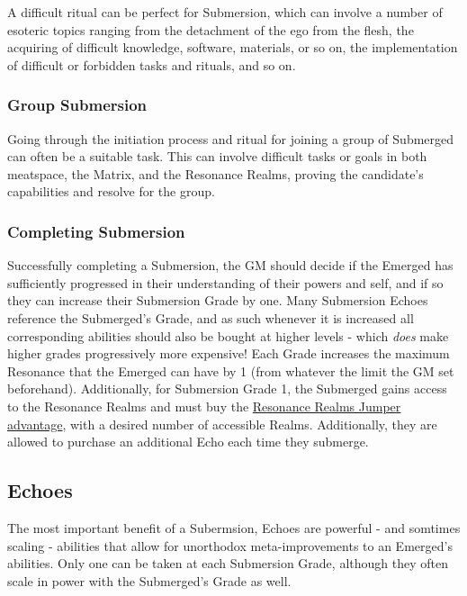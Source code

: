 \begin{multicols*}{3}
	A difficult ritual can be perfect for Submersion, which can involve a number of esoteric topics ranging from the detachment of the ego from the flesh, the acquiring of difficult knowledge, software, materials, or so on, the implementation of difficult or forbidden tasks and rituals, and so on.
	
	\subsubsection*{Group Submersion}
	
	Going through the initiation process and ritual for joining a group of Submerged can often be a suitable task. This can involve difficult tasks or goals in both meatspace, the Matrix, and the Resonance Realms, proving the candidate's capabilities and resolve for the group.
	
	\subsubsection*{Completing Submersion}
	
	Successfully completing a Submersion, the GM should decide if the Emerged has sufficiently progressed in their understanding of their powers and self, and if so they can increase their Submersion Grade by one. Many Submersion Echoes reference the Submerged's Grade, and as such whenever it is increased all corresponding abilities should also be bought at higher levels - which \textit{does} make higher grades progressively more expensive! Each Grade increases the maximum Resonance that the Emerged can have by 1 (from whatever the limit the GM set beforehand). Additionally, for Submersion Grade 1, the Submerged gains access to the Resonance Realms and must buy the \hyperref[resonance_realms_jumper]{Resonance Realms Jumper advantage}, with a desired number of accessible Realms. Additionally, they are allowed to purchase an additional Echo each time they submerge.
	
	\subsection{Echoes}
	
	The most important benefit of a Subermsion, Echoes are powerful - and somtimes scaling - abilities that allow for unorthodox meta-improvements to an Emerged's abilities. Only one can be taken at each Submersion Grade, although they often scale in power with the Submerged's Grade as well.
	

\end{multicols*}
